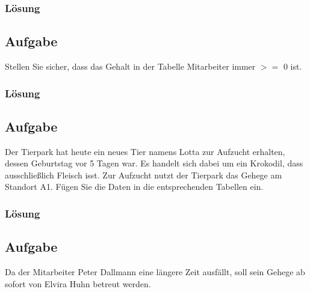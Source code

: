 \subsubsection*{Lösung}
\label{sec:uebung_01.aufgabe_03.loesung}


\subsection{Aufgabe}
\label{sec:uebung_01.aufgabe_04}
Stellen Sie sicher, dass das Gehalt in der Tabelle Mitarbeiter immer $>=$ 0 ist.

\subsubsection*{Lösung}
\label{sec:uebung_01.aufgabe_04.loesung}


\subsection{Aufgabe}
\label{sec:uebung_01.aufgabe_05}
Der Tierpark hat heute ein neues Tier namens Lotta zur Aufzucht erhalten, dessen Geburtstag vor 5 Tagen war. Es handelt sich dabei um ein Krokodil, dass ausschließlich Fleisch isst. Zur Aufzucht nutzt der Tierpark das Gehege am Standort A1. Fügen Sie die Daten in die entsprechenden Tabellen ein.

\subsubsection*{Lösung}
\label{sec:uebung_01.aufgabe_5.loesung}


\subsection{Aufgabe}
\label{sec:uebung_01.aufgabe_06}
Da der Mitarbeiter Peter Dallmann eine längere Zeit ausfällt, soll sein Gehege ab sofort von Elvira Huhn betreut werden.


